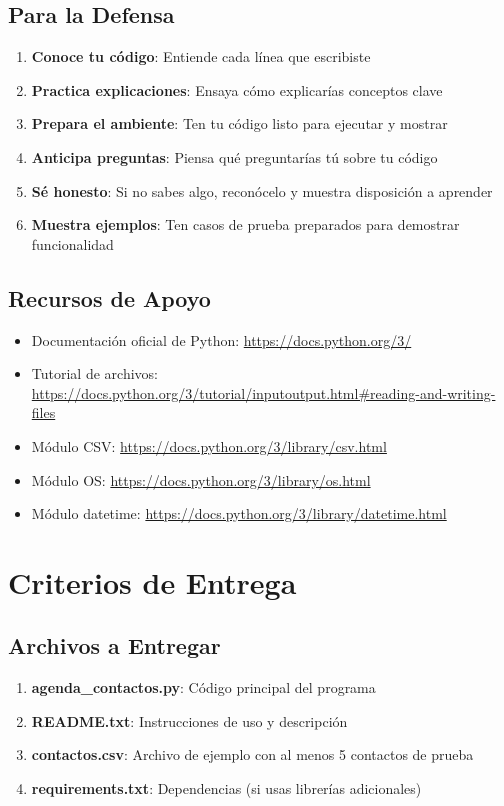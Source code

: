 \documentclass[11pt,letterpaper]{article}
\begin{document}
\subsection{Para la Defensa}

\begin{enumerate}
    \item \textbf{Conoce tu código}: Entiende cada línea que escribiste
    \item \textbf{Practica explicaciones}: Ensaya cómo explicarías conceptos clave
    \item \textbf{Prepara el ambiente}: Ten tu código listo para ejecutar y mostrar
    \item \textbf{Anticipa preguntas}: Piensa qué preguntarías tú sobre tu código
    \item \textbf{Sé honesto}: Si no sabes algo, reconócelo y muestra disposición a aprender
    \item \textbf{Muestra ejemplos}: Ten casos de prueba preparados para demostrar funcionalidad
\end{enumerate}

\subsection{Recursos de Apoyo}

\begin{itemize}
    \item Documentación oficial de Python: \url{https://docs.python.org/3/}
    \item Tutorial de archivos: \url{https://docs.python.org/3/tutorial/inputoutput.html#reading-and-writing-files}
    \item Módulo CSV: \url{https://docs.python.org/3/library/csv.html}
    \item Módulo OS: \url{https://docs.python.org/3/library/os.html}
    \item Módulo datetime: \url{https://docs.python.org/3/library/datetime.html}
\end{itemize}

\section{Criterios de Entrega}

\subsection{Archivos a Entregar}

\begin{enumerate}
    \item \textbf{agenda\_contactos.py}: Código principal del programa
    \item \textbf{README.txt}: Instrucciones de uso y descripción
    \item \textbf{contactos.csv}: Archivo de ejemplo con al menos 5 contactos de prueba
    \item \textbf{requirements.txt}: Dependencias (si usas librerías adicionales)
\end{enumerate}
\end{document}
